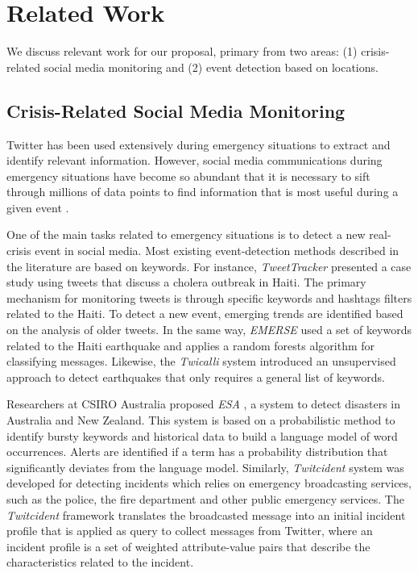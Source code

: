 \documentclass[sigconf]{acmart}
\begin{document}
\section{Related Work}

We discuss relevant work for our proposal, primary from two areas: (1) crisis-related social media monitoring and (2) event detection based on locations.

\subsection{Crisis-Related Social Media Monitoring}

Twitter has been used extensively during emergency situations to extract and identify relevant information. However, social media communications during emergency situations have become so abundant that it is necessary to sift through millions of data points to find information that is most useful during a given event \cite{imran2015processing}.

One of the main tasks related to emergency situations is to detect a new real-crisis event in social media. Most existing event-detection methods described in the literature are based on keywords. For instance, \textit{TweetTracker} \cite{kumar2011tweettracker} presented a case study using tweets that discuss a cholera outbreak in Haiti. The primary mechanism for monitoring tweets is through specific keywords and hashtags filters related to the Haiti. To detect a new event, emerging trends are identified based on the analysis of older tweets. In the same way, \textit{EMERSE} \cite{caragea2011classifying} used a set of keywords related to the Haiti earthquake and applies a random forests algorithm for classifying messages. Likewise, the \textit{Twicalli} system \cite{maldonado2017} introduced an unsupervised approach to detect earthquakes that only requires a general list of keywords. 

Researchers at CSIRO Australia proposed \textit{ESA} \cite{cameron2012emergency,yin2012esa}, a system to detect disasters in Australia and New Zealand. This system is based on a probabilistic method to identify bursty keywords and historical data to build a language model of word occurrences. Alerts are identified if a term has a probability distribution that significantly deviates from the language model. Similarly, \textit{Twitcident} \cite{abel2012twitcident} system was developed for detecting incidents which relies on emergency broadcasting services, such as the police, the fire department and other public emergency services. The \textit{Twitcident} framework translates the broadcasted message into an initial incident profile that is applied as query to collect messages from Twitter, where an incident profile is a set of weighted attribute-value pairs that describe the characteristics related to the incident. 
\end{document}
